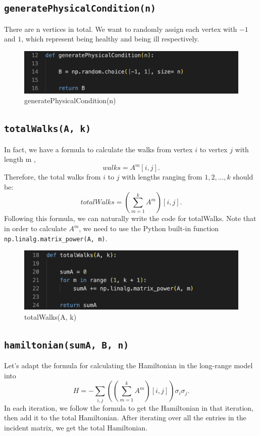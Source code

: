 \documentclass[11pt]{book}
\begin{document}
\subsection{\texttt{generatePhysicalCondition(n)}}
There are n vertices in total. We want to randomly assign each vertex with $-1$ and $1$, which represent being healthy and being ill respectively.

\begin{figure}
    \includegraphics[width=1\linewidth]{rg_generatePhysicalCondition.png}
    \caption{generatePhysicalCondition(n)}
    \label{fig49}
\end{figure}

\subsection{\texttt{totalWalks(A, k)}}
In fact, we have a formula to calculate the walks from vertex $i$ to vertex $j$ with length m \cite{Bol},
\[
walks = A^m[i, j].
\]
Therefore, the total walks from $i$ to $j$ with lengths ranging from $1, 2,..., k$ should be:
\[
totalWalks = \left(\sum_{m = 1}^{k} A^m \right)[i, j].
\]
Following this formula, we can naturally write the code for totalWalks. Note that in order to calculate $A^m$, we need to use the Python built-in function \texttt{np.linalg.matrix\_power(A, m)}.

\begin{figure}
    \centering
    \includegraphics[width=1\linewidth]{rg_totalWalks.png}
    \caption{totalWalks(A, k)}
    \label{fig50}
\end{figure}

\subsection{\texttt{hamiltonian(sumA, B, n)}}
Let's adapt the formula for calculating the Hamiltonian in the long-range model into
\[
H = -\sum_{i, j} \left( (\sum_{m = 1}^{k} A^m)[i, j] \right) \sigma_i \sigma_j.
\]
In each iteration, we follow the formula to get the Hamiltonian in that iteration, then add it to the total Hamiltonian. After iterating over all the entries in the incident matrix, we get the total Hamiltonian.
\end{document}
